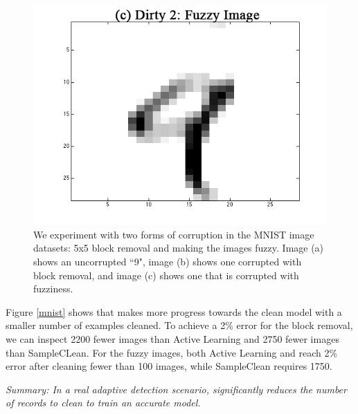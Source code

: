 \begin{figure}[ht]
 \includegraphics[scale=0.20]{exp/fuzzy.png}
 \caption{We experiment with two forms of corruption in the MNIST image datasets: 5x5 block removal and making the images fuzzy. Image (a) shows an uncorrupted ``9", image (b) shows one corrupted with block removal, and image (c) shows one that is corrupted with fuzziness. \label{mnist-corr}}
\end{figure}
\fi

Figure \ref{mnist} shows that \sys makes more progress towards the clean model with a smaller number of examples cleaned.
To achieve a 2\% error for the block removal, we can inspect 2200 fewer images than Active Learning and 2750 fewer images than SampleCLean.
For the fuzzy images, both Active Learning and \sys reach 2\% error after cleaning fewer than 100 images, while SampleClean requires 1750.

\vspace{0.25em}

\noindent \emph{Summary: In a real adaptive detection scenario, \sys significantly reduces the number of records to clean to train an accurate model. }

